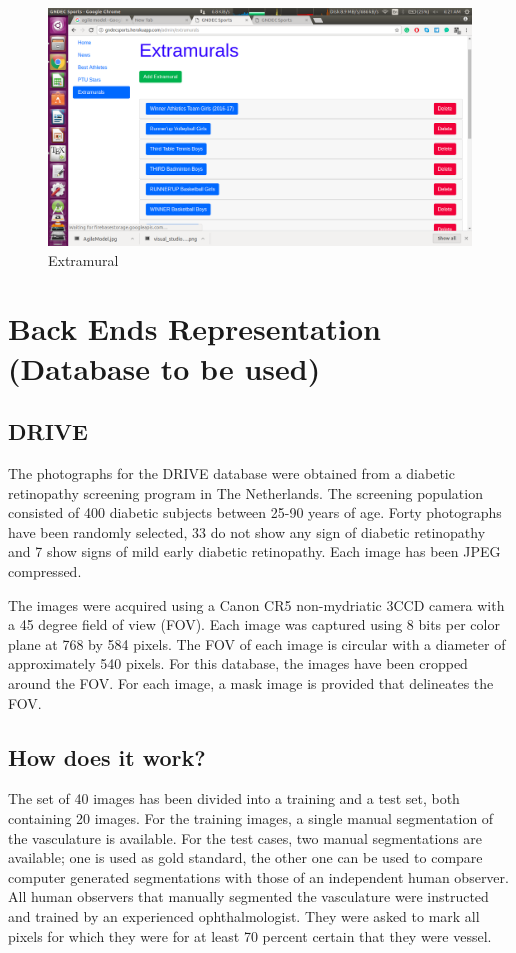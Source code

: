 \newpage

\begin{figure}[ht]
\centering
\includegraphics[scale=0.35]{images/ExtramuralHeroku.png}
\caption{Extramural}
\end{figure}


\newpage
\section{Back Ends Representation (Database to be used)}
\subsection{DRIVE}
The photographs for the DRIVE database were obtained from a diabetic retinopathy screening program in The Netherlands. The screening population consisted of 400 diabetic subjects between 25-90 years of age. Forty photographs have been randomly selected, 33 do not show any sign of diabetic retinopathy and 7 show signs of mild early diabetic retinopathy. Each image has been JPEG compressed.

The images were acquired using a Canon CR5 non-mydriatic 3CCD camera with a 45 degree field of view (FOV). Each image was captured using 8 bits per color plane at 768 by 584 pixels. The FOV of each image is circular with a diameter of approximately 540 pixels. For this database, the images have been cropped around the FOV. For each image, a mask image is provided that delineates the FOV.

\subsection{How does it work?}

The set of 40 images has been divided into a training and a test set, both containing 20 images. For the training images, a single manual segmentation of the vasculature is available. For the test cases, two manual segmentations are available; one is used as gold standard, the other one can be used to compare computer generated segmentations with those of an independent human observer. All human observers that manually segmented the vasculature were instructed and trained by an experienced ophthalmologist. They were asked to mark all pixels for which they were for at least 70 percent certain that they were vessel.

